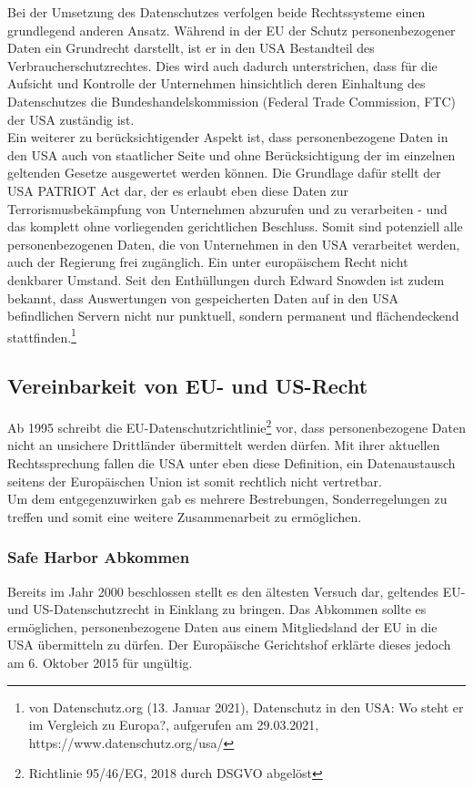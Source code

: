     Bei der Umsetzung des Datenschutzes verfolgen beide Rechtssysteme einen grundlegend anderen Ansatz. Während in der EU der Schutz personenbezogener Daten ein Grundrecht darstellt, ist er in den USA Bestandteil des Verbraucherschutzrechtes. Dies wird auch dadurch unterstrichen, dass für die Aufsicht und Kontrolle der Unternehmen hinsichtlich deren Einhaltung des Datenschutzes die Bundeshandelskommission (Federal Trade Commission, FTC) der USA zuständig ist.\\
    Ein weiterer zu berücksichtigender Aspekt ist, dass personenbezogene Daten in den USA auch von staatlicher Seite und ohne Berücksichtigung der im einzelnen geltenden Gesetze ausgewertet werden können. Die Grundlage dafür stellt der \glqq USA PATRIOT Act\grqq{} dar, der es erlaubt eben diese Daten zur Terrorismusbekämpfung von Unternehmen abzurufen und zu verarbeiten - und das komplett ohne vorliegenden gerichtlichen Beschluss. Somit sind potenziell alle personenbezogenen Daten, die von Unternehmen in den USA verarbeitet werden, auch der Regierung frei zugänglich. Ein unter europäischem Recht nicht denkbarer Umstand. Seit den Enthüllungen durch Edward Snowden ist zudem bekannt, dass Auswertungen von gespeicherten Daten auf in den USA befindlichen Servern nicht nur punktuell, sondern permanent und flächendeckend stattfinden.\footnote{von Datenschutz.org (13. Januar 2021), Datenschutz in den USA: Wo steht er im Vergleich zu Europa?, aufgerufen am 29.03.2021, https://www.datenschutz.org/usa/}
\subsection{Vereinbarkeit von EU- und US-Recht}
    Ab 1995 schreibt die EU-Datenschutzrichtlinie\footnote{Richtlinie 95/46/EG, 2018 durch DSGVO abgelöst} vor, dass personenbezogene Daten nicht an unsichere Drittländer übermittelt werden dürfen. Mit ihrer aktuellen Rechtssprechung fallen die USA unter eben diese Definition, ein Datenaustausch seitens der Europäischen Union ist somit rechtlich nicht vertretbar.\\
    Um dem entgegenzuwirken gab es mehrere Bestrebungen, Sonderregelungen zu treffen und somit eine weitere Zusammenarbeit zu ermöglichen.\\

\subsubsection{Safe Harbor Abkommen}
    Bereits im Jahr 2000 beschlossen stellt es den ältesten Versuch dar, geltendes EU- und US-Datenschutzrecht in Einklang zu bringen. Das Abkommen sollte es ermöglichen, personenbezogene Daten aus einem Mitgliedsland der EU in die USA übermitteln zu dürfen. Der Europäische Gerichtshof erklärte dieses jedoch am 6. Oktober 2015 für ungültig.\\

